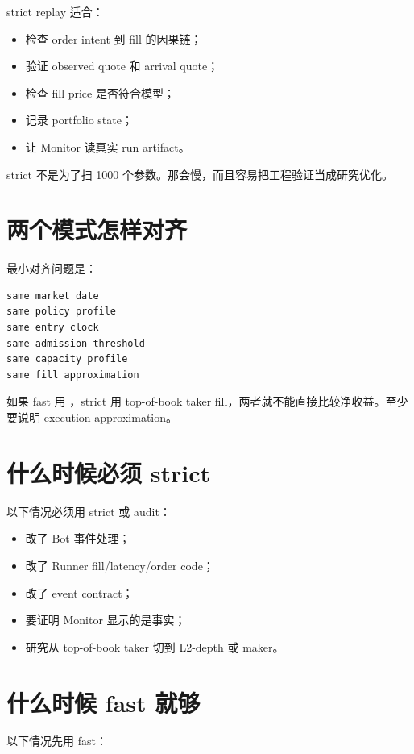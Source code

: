 strict replay 适合：

\begin{itemize}[leftmargin=2em]
  \item 检查 order intent 到 fill 的因果链；
  \item 验证 observed quote 和 arrival quote；
  \item 检查 fill price 是否符合模型；
  \item 记录 portfolio state；
  \item 让 Monitor 读真实 run artifact。
\end{itemize}

strict 不是为了扫 1000 个参数。那会慢，而且容易把工程验证当成研究优化。

\section{两个模式怎样对齐}

最小对齐问题是：

\begin{lstlisting}
same market date
same policy profile
same entry clock
same admission threshold
same capacity profile
same fill approximation
\end{lstlisting}

如果 fast 用 ，strict 用 top-of-book taker fill，两者就不能直接比较净收益。至少要说明 execution approximation。

\section{什么时候必须 strict}

以下情况必须用 strict 或 audit：

\begin{itemize}[leftmargin=2em]
  \item 改了 Bot 事件处理；
  \item 改了 Runner fill/latency/order code；
  \item 改了 event contract；
  \item 要证明 Monitor 显示的是事实；
  \item 研究从 top-of-book taker 切到 L2-depth 或 maker。
\end{itemize}

\section{什么时候 fast 就够}

以下情况先用 fast：

